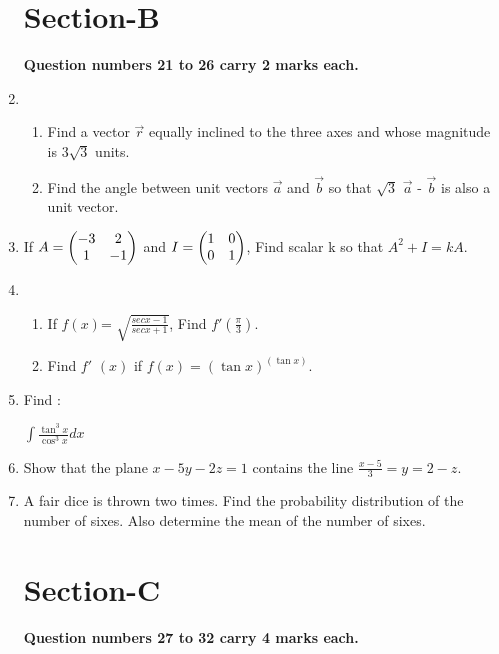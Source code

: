 \documentclass[journal,12pt,twocolumn]{IEEEtran}
\renewcommand\thesection{\arabic{section}}
\begin{document}
\begin{enumerate}[label=\thesection.\arabic*.,ref=\thesection.\theenumi]
\section{Section-B}

\textbf{Question numbers 21 to 26 carry 2 marks each.}\\


\item  \begin{enumerate} \item Find a vector $\overrightarrow{r}$ equally inclined to the three axes and whose magnitude is $3\sqrt{3}$ units.   
\item Find the angle between unit vectors $\overrightarrow{a}$ and $\overrightarrow{b}$ so that $\sqrt{3}$ $\overrightarrow{a}$ - $\overrightarrow{b}$ is also a unit vector.\\
\end{enumerate}
\item If $A=\begin{pmatrix}-3 & 2 \\ 1 & -1\end{pmatrix} $ and $ I=\begin{pmatrix}1 & 0 \\ 0 & 1\end{pmatrix}$, Find scalar k so that $A^2 + I = kA$.\\

\item \begin{enumerate} \item If $f\left(x\right)$= $\sqrt{\frac{sec x-1}{sec x+1}}$, Find $ f'\left(\frac{\pi}{3}\right)$.

\item Find $f'$ $\left(x\right)$ if $f\left(x\right)=\left(\tan x\right)^{\left(\tan x\right)}$.\\
\end{enumerate}
\item Find : \begin{center} $\int \frac{\tan^3x}{\cos^3x} dx $ \end{center} 

\item Show that the plane $x-5y-2z=1$ contains the line $\frac{x-5}{3}=y=2-z$.\\

\item A fair dice is thrown two times. Find the probability distribution of the number of sixes. Also determine the mean of the number of sixes.\\

\section{Section-C}
\textbf{Question numbers 27 to 32 carry 4 marks each.}\\


\end{enumerate}
\end{document}

